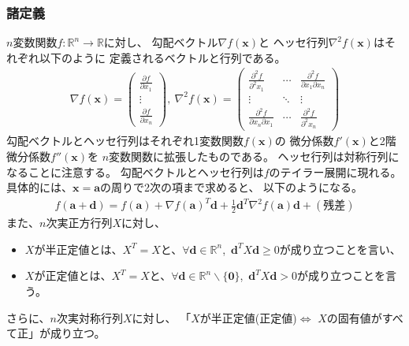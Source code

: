 \documentclass[12pt]{jarticle}
\begin{document}
\subsubsection{諸定義}
$n$変数関数$f:\mathbb{R}^n \rightarrow \mathbb{R}$に対し、
勾配ベクトル$\nabla f(\boldsymbol{x})$と
ヘッセ行列$\nabla^2f(\boldsymbol{x})$はそれぞれ以下のように
定義されるベクトルと行列である。
\begin{eqnarray}
    \nabla f(\boldsymbol{x})=\left(\begin{array}{c}
            \frac{\partial f}{\partial x_1} \\
            \vdots                          \\
            \frac{\partial f}{\partial x_n}
        \end{array}\right),\
    \nabla^2f(\boldsymbol{x})=\left(\begin{array}{ccc}
            \frac{\partial^2f}{\partial^2x_1}            & \cdots & \frac{\partial^2f}{\partial x_1\partial x_n} \\
            \vdots                                       & \ddots & \vdots                                       \\
            \frac{\partial^2f}{\partial x_n\partial x_1} & \cdots & \frac{\partial^2f}{\partial^2x_n}
        \end{array}\right)\nonumber
\end{eqnarray}
勾配ベクトルとヘッセ行列はそれぞれ1変数関数$f(\boldsymbol{x})$の
微分係数$f'(\boldsymbol{x})$と2階微分係数$f''(\boldsymbol{x})$を
$n$変数関数に拡張したものである。
ヘッセ行列は対称行列になることに注意する。
勾配ベクトルとヘッセ行列は$f$のテイラー展開に現れる。
具体的には、$\boldsymbol{x}=\boldsymbol{a}$の周りで2次の項まで求めると、
以下のようになる。
\begin{eqnarray}
    f(\boldsymbol{a}+\boldsymbol{d})=f(\boldsymbol{a})+\nabla f(\boldsymbol{a})^T\boldsymbol{d}+\frac{1}{2}\boldsymbol{d}^T\nabla^2f(\boldsymbol{a})\boldsymbol{d}+(残差)\nonumber
\end{eqnarray}
また、$n$次実正方行列$X$に対し、
\begin{itemize}
    \item $X$が半正定値とは、$X^T=X$と、$\forall\boldsymbol{d}\in\mathbb{R}^n $,\ $\boldsymbol{d}^TX\boldsymbol{d}\geq 0$が成り立つことを言い、
    \item $X$が正定値とは、$X^T=X$と、$\forall\boldsymbol{d}\in\mathbb{R}^n \backslash \{\boldsymbol{0}\}$,\ $\boldsymbol{d}^TX\boldsymbol{d}> 0$が成り立つことを言う。
\end{itemize}
さらに、$n$次実対称行列$X$に対し、
「$X$が半正定値(正定値)$\Leftrightarrow$ $X$の固有値がすべて正」が成り立つ。
\end{document}
